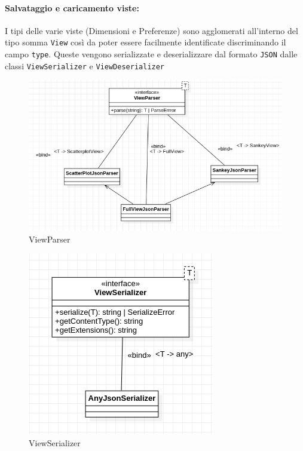\paragraph{Salvataggio e caricamento viste:}
I tipi delle varie viste (Dimensioni e Preferenze) sono agglomerati all'interno
del tipo somma \texttt{View} così da poter essere facilmente identificate
discriminando il campo \texttt{type}. Queste vengono serializzate e
deserializzare dal formato \texttt{JSON} dalle classi \texttt{ViewSerializer} e
\texttt{ViewDeserializer}

\begin{figure}[h!]
  \centering
  \includegraphics[scale=0.55]{../../assets/classi_uml/viewparser.png}
  \caption{ViewParser}
\end{figure}

\begin{figure}[h!]
  \centering
  \includegraphics[scale=0.55]{../../assets/classi_uml/viewserializer.png}
  \caption{ViewSerializer}
\end{figure}

